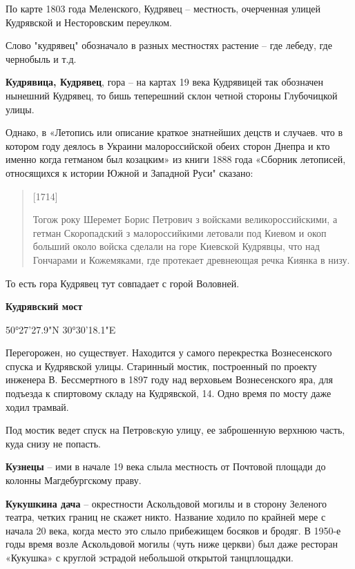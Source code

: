 По карте 1803 года Меленского, Кудрявец – местность, очерченная улицей Кудрявской и Несторовским переулком.

Слово "кудрявец" обозначало в разных местностях растение – где лебеду, где чернобыль и т.д.\\

\medskip

\textbf{Кудрявица, Кудрявец}, гора – на картах 19 века Кудрявицей так обозначен нынешний Кудрявец, то бишь теперешний склон четной стороны Глубочицкой улицы.

Однако, в «Летопись или описание краткое знатнейших децств и случаев. что в котором году деялось в Украини малороссийской обеих сторон Днепра и кто именно когда гетманом был козацким» из книги 1888 года «Сборник летописей, относящихся к истории Южной и Западной Руси" сказано:

\begin{quotation}
[1714]

Тогож року Шеремет Борис Петрович з войсками великороссийскими, а гетман Скоропадский з малороссийкими летовали под Киевом и окоп больший около войска сделали на горе Киевской Кудрявцы, что над Гончарами и Кожемяками, где протекает древнеющая речка Киянка в низу.
\end{quotation}

То есть гора Кудрявец тут совпадает с горой Воловней.\\


\medskip

\textbf{Кудрявский мост}

50°27'27.9"N 30°30'18.1"E

Перегорожен, но существует. Находится у самого перекрестка Вознесенского спуска и Кудрявской улицы. Старинный мостик, построенный по проекту инженера В. Бессмертного в 1897 году над верховьем Вознесенского яра, для подъезда к спиртовому складу на Кудрявской, 14. Одно время по мосту даже ходил трамвай.

Под мостик ведет спуск на Петровcкую улицу, ее заброшенную верхнюю часть, куда снизу не попасть.\\

\medskip


\textbf{Кузнецы} – ими в начале 19 века слыла местность от Почтовой площади до колонны Магдебургскому праву.\\

\medskip


\textbf{Кукушкина дача} – окрестности Аскольдовой могилы и в сторону Зеленого театра, четких границ не скажет никто. Название ходило по крайней мере с начала 20 века, когда место это слыло прибежищем босяков и бродяг. В 1950-е годы время возле Аскольдовой могилы (чуть ниже церкви) был даже ресторан «Кукушка» с круглой эстрадой небольшой открытой танцплощадки. \\

